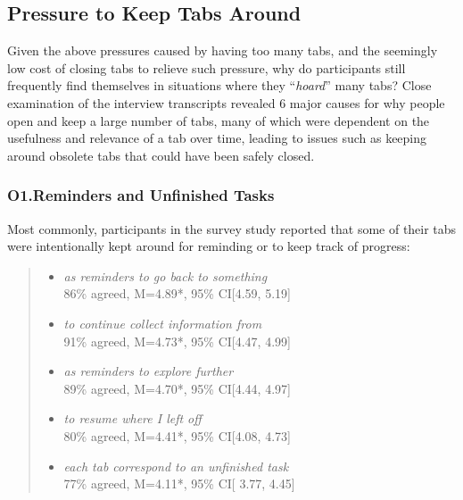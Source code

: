 


\subsection{Pressure to Keep Tabs Around}

Given the above pressures caused by having too many tabs, and the seemingly low cost of closing tabs to relieve such pressure, why do participants still frequently find themselves in situations where they ``\emph{hoard}'' many tabs?  Close examination of the interview transcripts revealed 6 major causes for why people open and keep a large number of tabs, many of which were dependent on the usefulness and relevance of a tab over time, leading to issues such as keeping around obsolete tabs that could have been safely closed.



\subsubsection{O1.Reminders and Unfinished Tasks}

Most commonly, participants in the survey study reported that some of their tabs were intentionally kept around for reminding or to keep track of progress:

\begin{quote}
\begin{itemize}

    \item \emph{as reminders to go back to something}\\86\% agreed, M=4.89*, 95\% CI[4.59, 5.19]
    \item \emph{to continue collect information from}\\91\% agreed, M=4.73*, 95\% CI[4.47, 4.99]
    \item \emph{as reminders to explore further}\\89\% agreed, M=4.70*, 95\% CI[4.44, 4.97]
    \item \emph{to resume where I left off}\\80\% agreed, M=4.41*, 95\% CI[4.08, 4.73]
    \item \emph{each tab correspond to an unfinished task}\\77\% agreed, M=4.11*, 95\% CI[ 3.77, 4.45] 
\end{itemize}
\end{quote}

